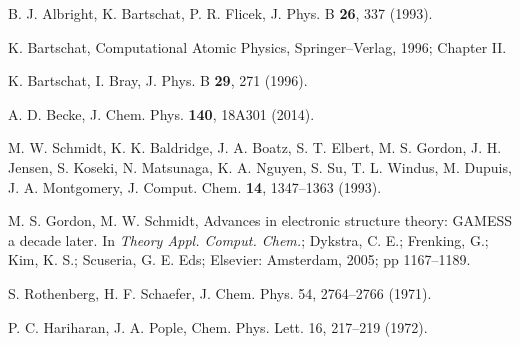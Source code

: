 \begin{thebibliography}{9}
\begin{comment}
\bibitem{Gorling:92}
A. G\"orling,
Phys. Rev. A \textbf{46}, 3753-3757 (1992).

\bibitem{Yang:02}
W. Yang, Q. Wu,
Phys. Rev. Lett. \textbf{89}, 143002 (2002).

\bibitem{Staroverov:06}
V. N. Staroverov, G. E. Scuseria, E. R. Davidson,
J. Chem. Phys. \textbf{124}, 11103 (2006).

\bibitem{Ryabinkin:13}
I. G. Ryabinkin, A. A. Kananenka, V. N. Staroverov,
Phys. Rev. Lett. \textbf{111}, 013001 (2013).

\bibitem{Umrigar:94} 
C. J. Umrigar, X. Gonze,
Phys. Rev. A \textbf{50}, 3827 (1994).

\bibitem{Gritsenko:97} 
O. V. Gritsenko, E. J. Baerends, 
Theor. Chem. Acc. \textbf{96}, 44 (1997).

\bibitem{Filippi:94} 
C. Filippi, C. J. Umrigar, M. Taut, 
J. Chem. Phys. \textbf{100}, 1290 (1994).

\end{comment}

B. J. Albright, K. Bartschat, P. R. Flicek,
J. Phys. B \textbf{26}, 337 (1993).

K. Bartschat, 
Computational Atomic Physics,
Springer--Verlag, 1996; Chapter II.

K. Bartschat, I. Bray, 
J. Phys. B \textbf{29}, 271 (1996).


A. D. Becke,
J. Chem. Phys. \textbf{140}, 18A301 (2014).


M. W. Schmidt, K. K. Baldridge, J. A. Boatz, S. T. Elbert, M. S. Gordon, 
J. H. Jensen, S. Koseki, N. Matsunaga, K. A. Nguyen, S. Su, T. L. Windus, 
M. Dupuis, J. A. Montgomery, 
J. Comput. Chem. \textbf{14}, 1347--1363 (1993).

M. S. Gordon, M. W. Schmidt, 
Advances in electronic structure theory: GAMESS a decade later. 
In \textit{Theory Appl. Comput. Chem.}; 
Dykstra, C. E.; Frenking, G.; Kim, K. S.; Scuseria, G. E. Eds;
Elsevier: Amsterdam, 2005; pp 1167--1189.

S. Rothenberg, H. F. Schaefer, 
J. Chem. Phys. 54, 2764--2766 (1971).

P. C. Hariharan, J. A. Pople, 
Chem. Phys. Lett. 16, 217--219 (1972).


\end{thebibliography}
